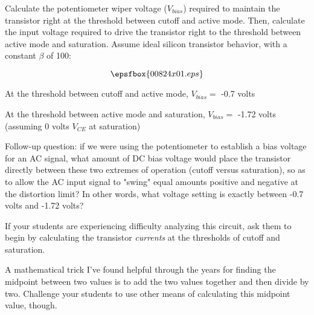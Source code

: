 

Calculate the potentiometer wiper voltage ($V_{bias}$) required to maintain the transistor right at the threshold between cutoff and active mode.  Then, calculate the input voltage required to drive the transistor right to the threshold between active mode and saturation.  Assume ideal silicon transistor behavior, with a constant $\beta$ of 100:

$$\epsfbox{00824x01.eps}$$







At the threshold between cutoff and active mode, $V_{bias} =$ -0.7 volts

\vskip 10pt

At the threshold between active mode and saturation, $V_{bias} =$ -1.72 volts (assuming 0 volts $V_{CE}$ at saturation)

\vskip 10pt

Follow-up question: if we were using the potentiometer to establish a bias voltage for an AC signal, what amount of DC bias voltage would place the transistor directly between these two extremes of operation (cutoff versus saturation), so as to allow the AC input signal to "swing" equal amounts positive and negative at the distortion limit?  In other words, what voltage setting is exactly between -0.7 volts and -1.72 volts?







If your students are experiencing difficulty analyzing this circuit, ask them to begin by calculating the transistor {\it currents} at the thresholds of cutoff and saturation.

A mathematical trick I've found helpful through the years for finding the midpoint between two values is to add the two values together and then divide by two.  Challenge your students to use other means of calculating this midpoint value, though.




